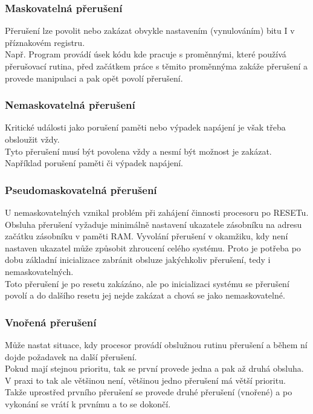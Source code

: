 \subsubsection*{Maskovatelná přerušení}
Přerušení lze povolit nebo zakázat obvykle nastavením (vynulováním) bitu I v příznakovém registru.\\
Např. Program provádí úsek kódu kde pracuje s proměnnými, které používá přerušovací rutina, před začátkem práce s těmito proměnnýma zakáže přerušení a provede manipulaci a pak opět povolí přerušení.\\

\subsubsection*{Nemaskovatelná přerušení}
Kritické události jako porušení paměti nebo výpadek napájení je však třeba obsloužit vždy. \\
Tyto přerušení musí být povolena vždy a nesmí být možnost je zakázat.\\
Například porušení paměti či výpadek napájení. \\

\subsubsection*{Pseudomaskovatelná přerušení}
U nemaskovatelných vznikal problém při zahájení činnosti procesoru po RESETu. Obsluha přerušení vyžaduje minimálně nastavení ukazatele zásobníku na adresu začátku zásobníku  v paměti RAM. Vyvolání přerušení v okamžiku, kdy není nastaven ukazatel může způsobit zhroucení celého systému. Proto je potřeba po dobu základní inicializace zabránit obsluze jakýchkoliv přerušení, tedy i nemaskovatelných. \\
Toto přerušení je po resetu zakázáno, ale po inicializaci systému se přerušení povolí a do dalšího resetu jej nejde zakázat a chová se jako nemaskovatelné. \\

\subsubsection*{Vnořená přerušení}
Může nastat situace, kdy procesor provádí obslužnou rutinu přerušení a během ní dojde požadavek na další přerušení. \\
Pokud mají stejnou prioritu, tak se první provede jedna a pak až druhá obsluha.\\
V praxi to tak ale většinou není, většinou jedno přerušení má větší prioritu. Takže uprostřed prvního přerušení se provede druhé přerušení (vnořené) a po vykonání se vrátí k prvnímu a to se dokončí.\\
